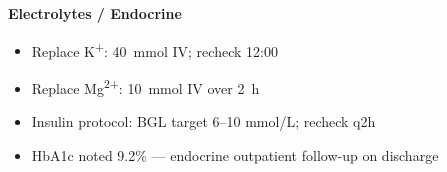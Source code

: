 \documentclass[11pt,a4paper]{scrartcl}
\begin{document}
\begin{tcolorbox}[planbox, title={\faPen\enspace Assessment \& Plan — Dr.\ Sandra Osei-Bonsu}]
\begin{minipage}[t]{0.47\linewidth}
    \vspace{4pt}
    \textbf{\color{MedMid}Electrolytes / Endocrine}\par
    \begin{itemize}[leftmargin=12pt, itemsep=1pt, topsep=2pt]
      \item Replace K\textsuperscript{+}: 40~mmol IV; recheck 12:00
      \item Replace Mg\textsuperscript{2+}: 10~mmol IV over 2~h
      \item Insulin protocol: BGL target 6--10 mmol/L; recheck q2h
      \item HbA1c noted 9.2\% — endocrine outpatient follow-up on discharge
    \end{itemize}
  \end{minipage}

\end{tcolorbox}

\vspace{6pt}
\end{document}
